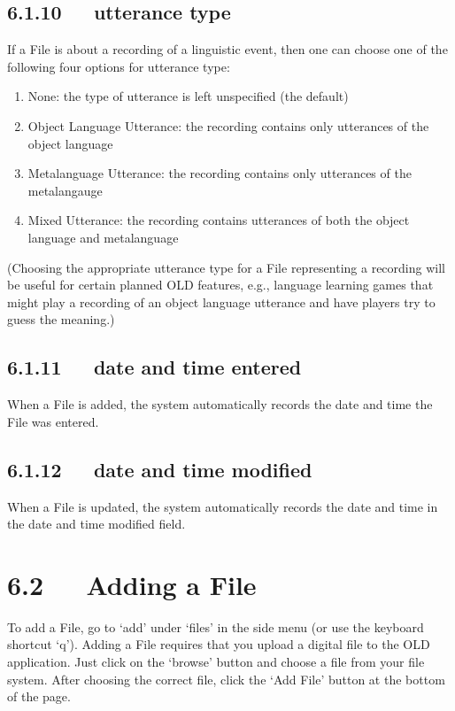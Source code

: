 \documentclass[letterpaper,10pt,english]{sphinxmanual}
\begin{document}
\subsection{6.1.10   utterance type}
\label{user_guide:utterance-type}
If a File is about a recording of a linguistic event, then one can choose one of
the following four options for utterance type:
\begin{enumerate}
\item {} 
None: the type of utterance is left unspecified (the default)

\item {} 
Object Language Utterance: the recording contains only utterances of the
object language

\item {} 
Metalanguage Utterance: the recording contains only utterances of the
metalangauge

\item {} 
Mixed Utterance: the recording contains utterances of both the object
language and metalanguage

\end{enumerate}

(Choosing the appropriate utterance type for a File representing a recording will
be useful for certain planned OLD features, e.g., language learning games that
might play a recording of an object language utterance and have players try to
guess the meaning.)


\subsection{6.1.11   date and time entered}
\label{user_guide:id6}
When a File is added, the system automatically records the date and time the
File was entered.


\subsection{6.1.12   date and time modified}
\label{user_guide:date-and-time-modified}
When a File is updated, the system automatically records the date and time in
the date and time modified field.


\section{6.2   Adding a File}
\label{user_guide:adding-a-file}
To add a File, go to `add' under `files' in the side menu (or use the keyboard
shortcut `q').  Adding a File requires that you upload a digital file to the OLD
application.  Just click on the `browse' button and choose a file from your file
system. After choosing the correct file, click the `Add File' button at
the bottom of the page.
\end{document}
